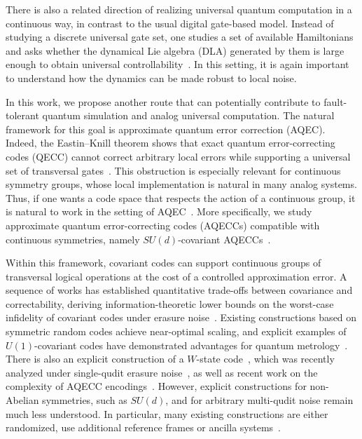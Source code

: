 \documentclass[10pt,twocolumn,superscriptaddress,aps,amsmath,amssymb,citeautoscript,floatfix,prx,longbibliography]{revtex4-2}
\newcounter{alg}
\theoremstyle{plain}
\theoremstyle{plain}
\theoremstyle{plain}
\theoremstyle{plain}
\theoremstyle{plain}
\theoremstyle{plain}
\begin{document}
There is also a related direction of realizing universal quantum computation in a continuous way, in contrast to the usual digital gate-based model. Instead of studying a discrete universal gate set, one studies a set of available Hamiltonians and asks whether the dynamical Lie algebra (DLA) generated by them is large enough to obtain universal controllability~\cite{Tavis1968,DAlessandro2021,Chen2020,Albertini2018,Albertini2020,Wang2016,Wang2012,Zanardi2004,AlbertiniDAlessandro2025,Hu2025}. In this setting, it is again important to understand how the dynamics can be made robust to local noise.

In this work, we propose another route that can potentially contribute to fault-tolerant quantum simulation and analog universal computation. The natural framework for this goal is approximate quantum error correction (AQEC). Indeed, the Eastin--Knill theorem shows that exact quantum error-correcting codes (QECC) cannot correct arbitrary local errors while supporting a universal set of transversal gates~\cite{Eastin2009}. This obstruction is especially relevant for continuous symmetry groups, whose local implementation is natural in many analog systems. Thus, if one wants a code space that respects the action of a continuous group, it is natural to work in the setting of AQEC~\cite{Beny2010}. More specifically, we study approximate quantum error-correcting codes (AQECCs) compatible with continuous symmetries, namely \(SU(d)\)-covariant AQECCs~\cite{Hayden2021}.

Within this framework, covariant codes can support continuous groups of transversal logical operations at the cost of a controlled approximation error. A sequence of works has established quantitative trade-offs between covariance and correctability, deriving information-theoretic lower bounds on the worst-case infidelity of covariant codes under erasure noise~\cite{Faist2020,Zhou2021,Faist2023,Kong2022,Yang2022}. Existing constructions based on symmetric random codes achieve near-optimal scaling, and explicit examples of \(U(1)\)-covariant codes have demonstrated advantages for quantum metrology~\cite{Lin2025}. There is also an explicit construction of a \(W\)-state code~\cite{Faist2020}, which was recently analyzed under single-qudit erasure noise~\cite{Alexander2025}, as well as recent work on the complexity of AQECC encodings~\cite{Yi2024}. However, explicit constructions for non-Abelian symmetries, such as \(SU(d)\), and for arbitrary multi-qudit noise remain much less understood. In particular, many existing constructions are either randomized, use additional reference frames or ancilla systems~\cite{Kong2022,Yang2022}.
\end{document}

